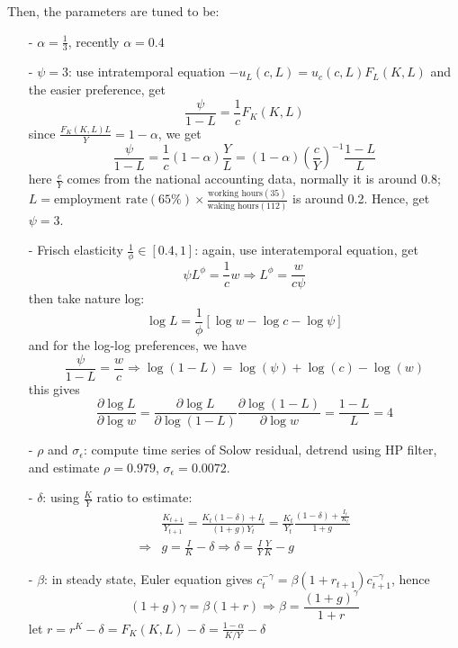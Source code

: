 \documentclass[10pt,landscape,a4paper]{article}
\begin{document}
\begin{multicols*}{3}
Then, the parameters are tuned to be:
\begin{itemize}
    \item[-] $\alpha=\frac{1}{3}$, recently $\alpha =0.4$ 
    \item[-] $\psi=3$: use intratemporal equation $-u_L(c,L)=u_c(c,L)F_L(K,L)$ and the easier preference, get
    $$
    \frac{\psi}{1-L} = \frac{1}{c}F_K(K,L)
    $$
    since $\frac{F_K(K,L)L}{Y}=1-\alpha$, we get
    $$
    \frac{\psi}{1-L} = \frac{1}{c}(1-\alpha)\frac{Y}{L}=(1-\alpha)\left(\frac{c}{Y}\right)^{-1}\frac{1-L}{L}
    $$
    here $\frac{c}{Y}$ comes from the national accounting data, normally it is around 0.8; $L=\text{employment rate}(65\%)\times\frac{\text{working hours}(35)}{\text{waking hours}(112)}$ is around 0.2. Hence, get $\psi=3$.
    \item[-] Frisch elasticity $\frac{1}{\phi} \in [0.4,1]$: again, use interatemporal equation, get 
    $$
    \psi L^{\phi}=\frac{1}{c}w\Rightarrow L^{\phi}=\frac{w}{c\psi}
    $$
    then take nature log:
    $$
    \log L=\frac{1}{\phi}\left[ \log w-\log c -\log \psi \right]
    $$
    and for the log-log preferences, we have
    $$
    \frac{\psi}{1-L}=\frac{w}{c}\Rightarrow\log(1-L)=\log(\psi)+\log(c)-\log(w)
    $$
    this gives 
    $$
    \frac{\partial \log L}{\partial \log w}=\frac{\partial \log L}{\partial \log(1-L)}\frac{\partial\log(1-L)}{\partial\log w}=\frac{1-L}{L}=4
    $$
    \item[-] $\rho$ and $\sigma_{\epsilon}$: compute time series of Solow residual, detrend using HP filter, and estimate $\rho=0.979$, $\sigma_{\epsilon}=0.0072$.
    \item[-] $\delta$: using $\frac{K}{Y}$ ratio to estimate:
    \begin{align*}
        &\frac{K_{t+1}}{Y_{t+1}}=\frac{K_t(1-\delta)+I_t}{(1+g)Y_t}=\frac{K_t}{Y_t}\frac{(1-\delta)+\frac{I_t}{K_t}}{1+g}\\
        \Rightarrow & g=\frac{I}{K}-\delta\Rightarrow \delta = \frac{I}{Y}\frac{Y}{K}-g
    \end{align*}
    \item[-] $\beta$: in steady state, Euler equation gives $c_t^{-\gamma}=\beta (1+r_{t+1})c_{t+1}^{-\gamma}$, hence
    $$
    (1+g)\gamma =\beta(1+r)\Rightarrow \beta =\frac{(1+g)^{\gamma}}{1+r}
    $$
    let $r=r^K-\delta=F_K(K,L)-\delta=\frac{1-\alpha}{K/Y}-\delta$
\end{itemize}


\end{multicols*}
\end{document}
